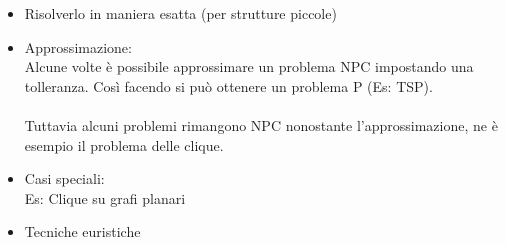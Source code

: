 \begin{itemize}
\item Risolverlo in maniera esatta (per strutture piccole)
\item Approssimazione: \\
Alcune volte è possibile approssimare un problema NPC impostando una tolleranza. Così facendo si può ottenere un problema P (Es: TSP). \\
\\
Tuttavia alcuni problemi rimangono NPC nonostante l'approssimazione, ne è esempio il problema delle clique.
\item Casi speciali: \\
Es: Clique su grafi planari
\item Tecniche euristiche
\end{itemize}


